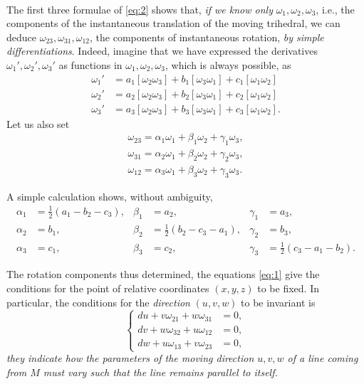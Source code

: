 \documentclass[leqno,12pt]{article}
\theoremstyle{shape1}
\theoremstyle{shape0}
\theoremstyle{shape2}
\theoremstyle{definition}
\begin{document}
\paragraph{}
\label{sec:2}
The first three formulae of \eqref{eq:2} shows that, \emph{if we know only} $\omega_{1},\omega_{2},\omega_{3}$, i.e., the components of the instantaneous translation of the moving trihedral, we can deduce $\omega_{23},\omega_{31},\omega_{12}$, the components of instantaneous rotation, \emph{by simple differentiations}. Indeed, imagine that we have expressed the derivatives $\omega_{1}',\omega_{2}',\omega_{3}'$ as functions in $\omega_{1},\omega_{2},\omega_{3}$, which is always possible, as
\begin{align*}
  \omega_{1}'&=a_{1}[\omega_{2}\omega_{3}]+b_{1}[\omega_{3}\omega_{1}]+c_{1}[\omega_{1}\omega_{2}]\\
  \omega_{2}'&=a_{2}[\omega_{2}\omega_{3}]+b_{2}[\omega_{3}\omega_{1}]+c_{2}[\omega_{1}\omega_{2}]\\
  \omega_{3}'&=a_{3}[\omega_{2}\omega_{3}]+b_{3}[\omega_{3}\omega_{1}]+c_{3}[\omega_{1}\omega_{2}].
\end{align*}
Let us also set
\begin{align*}
  \omega_{23}=\alpha_{1}\omega_{1}+\beta_{1}\omega_{2}+\gamma_{1}\omega_{3},\\
  \omega_{31}=\alpha_{2}\omega_{1}+\beta_{2}\omega_{2}+\gamma_{2}\omega_{3},\\
  \omega_{12}=\alpha_{3}\omega_{1}+\beta_{3}\omega_{2}+\gamma_{3}\omega_{3}.
\end{align*}

A simple calculation shows, without ambiguity,
\begin{align*}
  \alpha_{1}&=\frac{1}{2}(a_{1}-b_{2}-c_{3}),&\beta_{1}&=a_{2},&\gamma_{1}&=a_{3},\\
  \alpha_{2}&=b_{1},&\beta_{2}&=\frac{1}{2}(b_{2}-c_{3}-a_{1}),&\gamma_{2}&=b_{3},\\
  \alpha_{3}&=c_{1},&\beta_{3}&=c_{2},&\gamma_{3}&=\frac{1}{2}(c_{3}-a_{1}-b_{2}).
\end{align*}

The rotation components thus determined, the equations \eqref{eq:1} give the conditions for the point of relative coordinates $(x,y,z)$ to be fixed. In particular, the conditions for the \emph{direction} $(u,v,w)$ to be invariant is
\begin{equation}
  \label{eq:3}
  \left\{
    \begin{aligned}
      du+v\omega_{21}+w\omega_{31}&=0,\\
      dv+w\omega_{32}+u\omega_{12}&=0,\\
      dw+u\omega_{13}+v\omega_{23}&=0,
    \end{aligned}
  \right.
\end{equation}
\emph{they indicate how the parameters of the moving direction $u,v,w$ of a line coming from $M$ must vary such that the line remains parallel to itself.}
\end{document}
